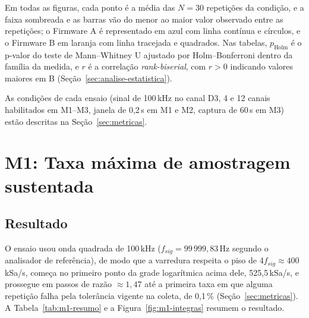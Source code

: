 Em todas as figuras, cada ponto é a média das $N = 30$ repetições da
condição, e a faixa sombreada e as barras vão do menor ao maior valor
observado entre as repetições; o Firmware A é
representado em azul com linha contínua e círculos, e o Firmware B em laranja
com linha tracejada e quadrados. Nas tabelas, $p_{\mathrm{Holm}}$ é o p-valor
do teste de Mann--Whitney U ajustado por Holm--Bonferroni dentro da família
da medida, e $r$ é a correlação \emph{rank-biserial}, com $r > 0$ indicando
valores maiores em B (Seção~\ref{sec:analise-estatistica}).

As condições de cada ensaio (sinal de 100\,kHz no canal D3, 4 e 12 canais
habilitados em M1--M3, janela de 0,2\,s em M1 e M2, captura de 60\,s em M3)
estão descritas na Seção~\ref{sec:metricas}.

\section{M1: Taxa máxima de amostragem sustentada}\label{sec:res-m1}

\subsection{Resultado}

O ensaio usou onda quadrada de 100\,kHz ($f_{sig} = 99{\,}999{,}83$\,Hz
segundo o analisador de referência), de modo que a varredura respeita o piso
de $4 f_{sig} \approx 400$\,kSa/s, começa no primeiro ponto da grade
logarítmica acima dele, 525,5\,kSa/s, e prossegue em passos de razão
$\approx 1{,}47$ até a primeira taxa em que alguma repetição falha pela
tolerância vigente na coleta, de 0,1\,\% (Seção~\ref{sec:metricas}). A
Tabela~\ref{tab:m1-resumo} e a
Figura~\ref{fig:m1-integras} resumem o resultado.

